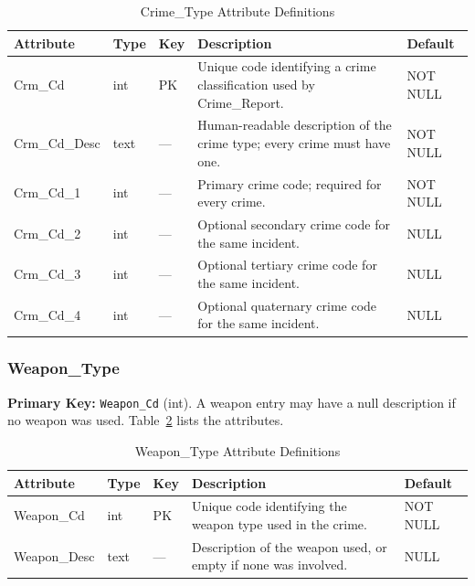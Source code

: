 \documentclass[conference]{IEEEtran}
\begin{document}
\begin{table}[htbp]
\caption{Crime\_Type Attribute Definitions}
\label{tab:crimetype}
\begin{center}
\footnotesize
\begin{tabular}{|p{1.6cm}|p{1.3cm}|p{0.5cm}|p{3.2cm}|p{1.2cm}|}
\hline
\textbf{Attribute} & \textbf{Type} & \textbf{Key} & \textbf{Description} & \textbf{Default} \\
\hline
Crm\_Cd & int & PK & Unique code identifying a crime classification used by Crime\_Report. & NOT NULL \\
\hline
Crm\_Cd\_Desc & text & --- & Human-readable description of the crime type; every crime must have one. & NOT NULL \\
\hline
Crm\_Cd\_1 & int & --- & Primary crime code; required for every crime. & NOT NULL \\
\hline
Crm\_Cd\_2 & int & --- & Optional secondary crime code for the same incident. & NULL \\
\hline
Crm\_Cd\_3 & int & --- & Optional tertiary crime code for the same incident. & NULL \\
\hline
Crm\_Cd\_4 & int & --- & Optional quaternary crime code for the same incident. & NULL \\
\hline
\end{tabular}
\end{center}
\end{table}

\subsubsection{Weapon\_Type}

\textbf{Primary Key:} \texttt{Weapon\_Cd} (int). A weapon entry may have a null description if no weapon was used. Table~\ref{tab:weapon} lists the attributes.

\begin{table}[htbp]
\caption{Weapon\_Type Attribute Definitions}
\label{tab:weapon}
\begin{center}
\footnotesize
\begin{tabular}{|p{1.6cm}|p{1.3cm}|p{0.5cm}|p{3.2cm}|p{1.2cm}|}
\hline
\textbf{Attribute} & \textbf{Type} & \textbf{Key} & \textbf{Description} & \textbf{Default} \\
\hline
Weapon\_Cd & int & PK & Unique code identifying the weapon type used in the crime. & NOT NULL \\
\hline
Weapon\_Desc & text & --- & Description of the weapon used, or empty if none was involved. & NULL \\
\hline
\end{tabular}
\end{center}
\end{table}
\end{document}
